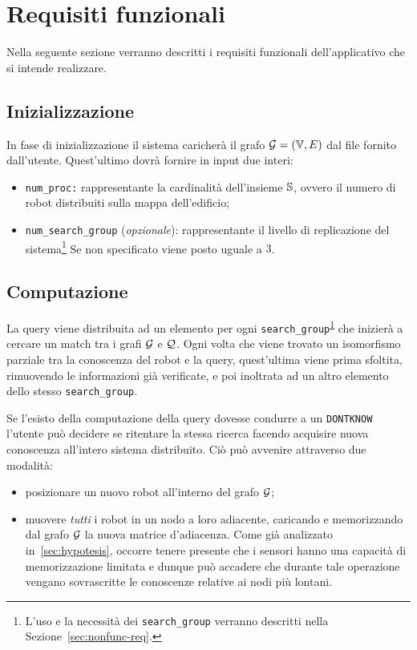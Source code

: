 \documentclass{llncs}
\begin{document}
\section{Requisiti funzionali}
Nella seguente sezione verranno descritti i requisiti funzionali
dell'applicativo che si intende realizzare.

\subsection{Inizializzazione}
In fase di inizializzazione il sistema caricherà il grafo $\mathcal{G} = ( \mathbb{V}, E)$ dal file
fornito dall'utente. Quest'ultimo dovrà fornire in input due interi:
\begin{itemize}
\item \texttt{num\_proc:} rappresentante la cardinalità dell'insieme $\mathbb{S}$, ovvero il numero di
robot distribuiti sulla mappa dell'edificio;
\item \texttt{num\_search\_group} (\emph{opzionale}): rappresentante
  il livello di replicazione del sistema\footnote{\label{fn:searchgroup}
    L'uso e la necessità dei \texttt{search\_group} verranno descritti
    nella Sezione~\ref{sec:nonfunc-req}.} Se non specificato viene posto uguale a $3$.
\end{itemize}

\subsection{Computazione}
\label{sec:computation}
La query viene distribuita ad un elemento per ogni \texttt{search\_group}\textsuperscript{\ref{fn:searchgroup}}
che inizierà a cercare un match tra i grafi $\mathcal{G}$ e $\mathcal{Q}$. Ogni volta che viene trovato un isomorfismo
parziale tra la conoscenza del robot e la query, quest'ultima viene prima sfoltita, rimuovendo
le informazioni già verificate, e poi inoltrata ad
un altro elemento dello stesso \texttt{search\_group}.

Se l'esisto della computazione della query dovesse condurre a un \texttt{DONTKNOW}
l'utente può decidere se ritentare la stessa ricerca facendo acquisire nuova conoscenza
all'intero sistema distribuito. Ciò può avvenire attraverso due modalità:
\begin{itemize}
	\item posizionare un nuovo robot all'interno del grafo $\mathcal{G}$;
	\item muovere \emph{tutti} i robot in un nodo a loro adiacente, caricando e memorizzando
	  dal grafo $\mathcal{G}$ la nuova matrice d'adiacenza.
          Come già analizzato in~\ref{sec:hypotesis},
          occorre tenere presente che i sensori hanno
	una capacità di memorizzazione limitata e dunque può accadere che durante
	tale operazione vengano sovrascritte le conoscenze relative ai nodi più lontani.
\end{itemize}
\end{document}
